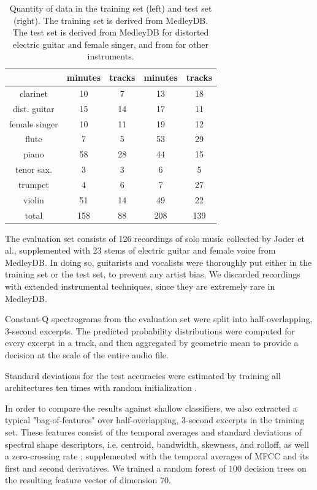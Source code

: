 \documentclass{article}
\makeatletter
\newcommand*{\ie}{i.e.\@\xspace}
\newcommand*{\etal}{et al.\@\xspace}
\makeatother
\begin{document}
\begin{table}
	\begin{center}
	\begin{tabular}{|c|cc|cc|}
		\hline
		& minutes & tracks & minutes & tracks \\
		\hline
		clarinet & 10 & 7 & 13 & 18 \\
		dist. guitar & 15 & 14 & 17 & 11 \\
		female singer & 10 & 11 & 19 & 12 \\
		flute & 7 & 5 & 53 & 29 \\
		piano & 58 & 28 & 44 & 15 \\
		tenor sax. & 3 & 3 & 6 & 5 \\
		trumpet & 4 & 6 & 7 & 27 \\
		violin & 51 & 14 & 49 & 22 \\
		\hline
		total & 158 & 88 & 208 & 139 \\
		\hline
	\end{tabular}
	\end{center}
	\caption{
	Quantity of data in the training set (left) and test set (right).
	The training set is derived from MedleyDB.
	The test set is derived from MedleyDB for distorted electric guitar and female singer,
	and from \cite{Joder2009} for other instruments.
	\label{table:single-label-durations}}
\end{table}

The evaluation set consists of 126 recordings of solo music collected by
Joder \etal \cite{Joder2009}, supplemented with
23 stems of electric guitar and female voice from MedleyDB.
In doing so, guitarists and vocalists were thoroughly put either in the training set or the test set,
to prevent any artist bias.
We discarded recordings with extended instrumental techniques, since they are
extremely rare in MedleyDB.

Constant-Q spectrograms from the evaluation set were split into half-overlapping,
3-second excerpts.
The predicted probability distributions were computed for every excerpt in a track,
and then aggregated by geometric mean to provide a decision at the scale of
the entire audio file.

Standard deviations for the test accuracies were estimated by training all architectures
ten times with random initialization \cite{He2015}.

In order to compare the results against shallow classifiers, we also extracted a typical
"bag-of-features" over half-overlapping, 3-second excerpts in the training set.
These features consist of the temporal averages and standard
deviations of spectral shape descriptors, \ie centroid, bandwidth, skewness,
and rolloff, as well a zero-crossing rate ;
supplemented with the temporal averages of MFCC and its first and second derivatives.
We trained a random forest of $100$ decision trees on the resulting feature vector
of dimension $70$.
\end{document}
